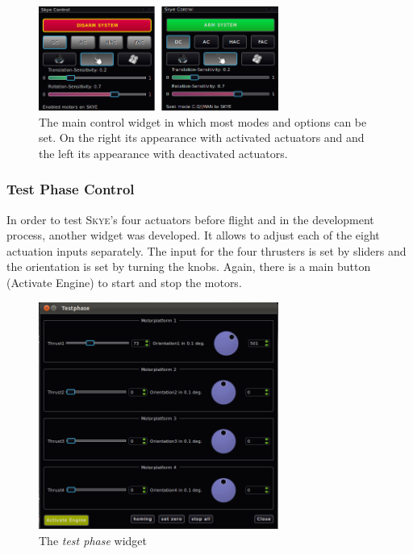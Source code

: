 \begin{figure}[H] %
	\begin{center}
		\includegraphics[width=0.7\textwidth]{qgc_skye_control}
		\caption{The main control widget in which most modes and options can be set. On the right its appearance with activated actuators and and the left its appearance with deactivated actuators.}
		\label{fig:qgc_skye_control}		
	\end{center}
\end{figure}



\subsubsection{Test Phase Control}
In order to test \textsc{Skye}'s four actuators before flight and in the development process, another widget was developed. It allows to adjust each of the eight actuation inputs separately. The input for the four thrusters is set by sliders and the orientation is set by turning the knobs. Again, there is a main button (Activate Engine) to start and stop the motors.

\begin{figure}[H] %
	\begin{center}
		\includegraphics[width=0.7\textwidth]{qgc_test_phase}
		\caption{The \textit{test phase} widget }  
		\label{figure:qgc_test_phase}
	\end{center}
\end{figure}


